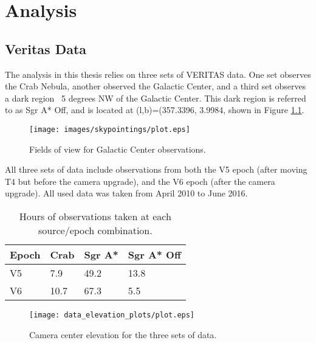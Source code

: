 \cleartooddpage[\thispagestyle{empty}]
\chapter{Analysis}

\section{Veritas Data}
  The analysis in this thesis relies on three sets of VERITAS data.
  One set observes the Crab Nebula, another observed the Galactic Center, and a third set observes a dark region ~5 degrees NW of the Galactic Center.
  This dark region is referred to as  Sgr A* Off, and is located at (l,b)=(357.3396\degree, 3.9984\degree, shown in Figure \ref{fig:gcfieldsofview}.

  \begin{figure}[ht]
    \begin{center}
      \texttt{[image: images/skypointings/plot.eps]}
      \caption[VERITAS Galactic Center Pointings]{Fields of view for Galactic Center observations.}\label{fig:gcfieldsofview}
    \end{center}
  \end{figure}

  All three sets of data include observations from both the V5 epoch (after moving T4 but before the camera upgrade), and the V6 epoch (after the camera upgrade).
  All used data was taken from April 2010 to June 2016.

  \begin{table}[]
  \centering
  \caption{Hours of observations taken at each source/epoch combination.}
  \label{my-label}
  \begin{tabular}{|l|l|l|l|}
  \hline
  \textbf{Epoch} & \textbf{Crab} & \textbf{Sgr A*} & \textbf{Sgr A* Off} \\ \hline
  V5             & 7.9           & 49.2            & 13.8                \\ \hline
  V6             & 10.7          & 67.3            & 5.5                 \\ \hline
  \end{tabular}
  \end{table}


  \begin{figure}[ht]
    \begin{center}
      \texttt{[image: data\_elevation\_plots/plot.eps]}
      \caption[VERITAS Data Elevation Exposure]{Camera center elevation for the three sets of data.}\label{fig:datapointingelevations}
    \end{center}
  \end{figure}

